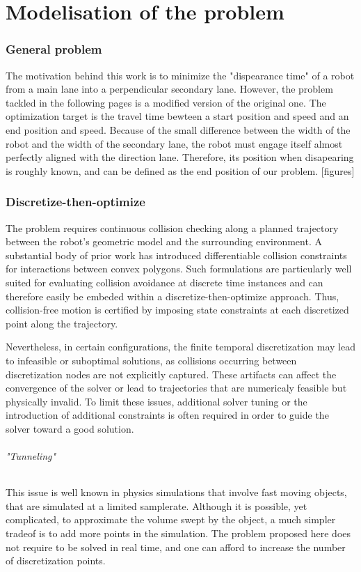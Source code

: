 \documentclass[a4paper]{article}
\begin{document}
	
	
	
	\part{Modelisation of the problem}
	\section{General problem}
	The motivation behind this work is to minimize the "dispearance time" of a robot from a main lane into a perpendicular secondary lane. However, the problem tackled in the following pages is a modified version of the original one. The optimization target is the travel time bewteen a start position and speed and an end position and speed. Because of the small difference between the width of the robot and the width of the secondary lane, the robot must engage itself almost perfectly aligned with the direction lane. Therefore, its position when disapearing is roughly known, and can be defined as the end position of our problem. [figures]
	
	\section{Discretize-then-optimize}
	The problem requires continuous collision checking along a planned trajectory between the robot’s geometric model and the surrounding environment. A substantial body of prior work has introduced differentiable collision constraints for interactions between convex polygons. Such formulations are particularly well suited for evaluating collision avoidance at discrete time instances and can therefore easily be embeded within a discretize-then-optimize approach. Thus, collision-free motion is certified by imposing state constraints at each discretized point along the trajectory.
	
	Nevertheless, in certain configurations, the finite temporal discretization may lead to infeasible or suboptimal solutions, as collisions occurring between discretization nodes are not explicitly captured. These artifacts can affect the convergence of the solver or lead to trajectories that are numericaly feasible but physically invalid. To limit these issues, additional solver tuning or the introduction of additional constraints is often required in order to guide the solver toward a good solution.
	
	
	\paragraph{"Tunneling"}
	This issue is well known in physics simulations that involve fast moving objects, that are simulated at a limited samplerate. Although it is possible, yet complicated, to approximate the volume swept by the object, a much simpler tradeof is to add more points in the simulation. The problem proposed here does not require to be solved in real time, and one can afford to increase the number of discretization points.
	
\end{document}
